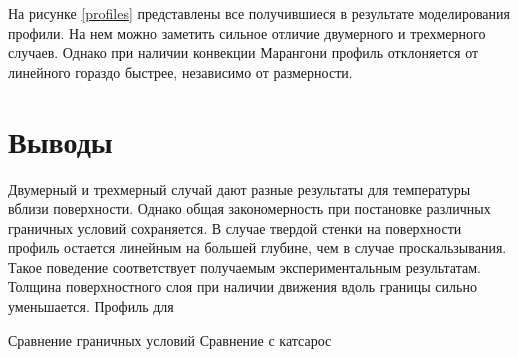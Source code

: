 \documentclass[a4paper, 14pt]{extarticle}
\begin{document}
На рисунке \ref{profiles} представлены все получившиеся в результате моделирования профили. На нем можно заметить сильное отличие двумерного и трехмерного случаев. Однако при наличии конвекции Марангони профиль отклоняется от линейного гораздо быстрее, независимо от размерности. 

\section{Выводы}

Двумерный и трехмерный случай дают разные результаты для температуры вблизи поверхности. Однако общая закономерность при постановке различных граничных условий сохраняется. В случае твердой стенки на поверхности профиль остается линейным на большей глубине, чем в случае проскальзывания. Такое поведение соответствует получаемым экспериментальным результатам. Толщина поверхностного слоя при наличии движения вдоль границы сильно уменьшается. Профиль для

Сравнение граничных условий
Сравнение с катсарос



\end{document}
